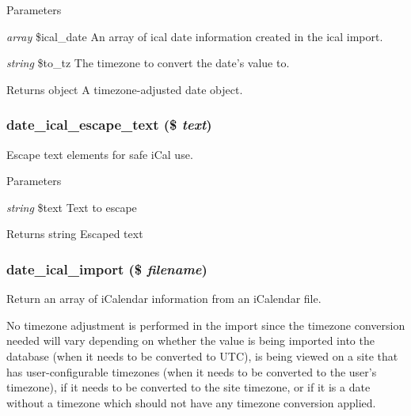 \begin{DoxyParams}{Parameters}
\item[{\em array}]\$ical\_\-date An array of ical date information created in the ical import. \item[{\em string}]\$to\_\-tz The timezone to convert the date's value to.\end{DoxyParams}
\begin{DoxyReturn}{Returns}
object A timezone-\/adjusted date object. 
\end{DoxyReturn}
\hypertarget{date__api__ical_8inc_af17a30f380d9be0902300cd7bfc5eaa0}{
\subsubsection[{date\_\-ical\_\-escape\_\-text}]{\setlength{\rightskip}{0pt plus 5cm}date\_\-ical\_\-escape\_\-text (\$ {\em text})}}
\label{date__api__ical_8inc_af17a30f380d9be0902300cd7bfc5eaa0}
Escape text elements for safe iCal use.


\begin{DoxyParams}{Parameters}
\item[{\em string}]\$text Text to escape\end{DoxyParams}
\begin{DoxyReturn}{Returns}
string Escaped text 
\end{DoxyReturn}
\hypertarget{date__api__ical_8inc_a9c32ef84b7717c5f5b9333a14aab9e17}{
\subsubsection[{date\_\-ical\_\-import}]{\setlength{\rightskip}{0pt plus 5cm}date\_\-ical\_\-import (\$ {\em filename})}}
\label{date__api__ical_8inc_a9c32ef84b7717c5f5b9333a14aab9e17}
Return an array of iCalendar information from an iCalendar file.

No timezone adjustment is performed in the import since the timezone conversion needed will vary depending on whether the value is being imported into the database (when it needs to be converted to UTC), is being viewed on a site that has user-\/configurable timezones (when it needs to be converted to the user's timezone), if it needs to be converted to the site timezone, or if it is a date without a timezone which should not have any timezone conversion applied.

